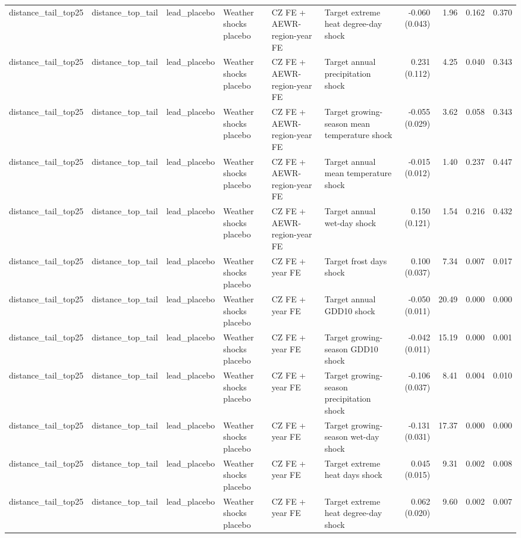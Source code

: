 \begin{tabular}{llllllrrrr}
distance_tail_top25 & distance_top_tail & lead_placebo & Weather shocks placebo & CZ FE + AEWR-region-year FE & Target extreme heat degree-day shock & -0.060 (0.043) & 1.96 & 0.162 & 0.370 \\
distance_tail_top25 & distance_top_tail & lead_placebo & Weather shocks placebo & CZ FE + AEWR-region-year FE & Target annual precipitation shock & 0.231 (0.112) & 4.25 & 0.040 & 0.343 \\
distance_tail_top25 & distance_top_tail & lead_placebo & Weather shocks placebo & CZ FE + AEWR-region-year FE & Target growing-season mean temperature shock & -0.055 (0.029) & 3.62 & 0.058 & 0.343 \\
distance_tail_top25 & distance_top_tail & lead_placebo & Weather shocks placebo & CZ FE + AEWR-region-year FE & Target annual mean temperature shock & -0.015 (0.012) & 1.40 & 0.237 & 0.447 \\
distance_tail_top25 & distance_top_tail & lead_placebo & Weather shocks placebo & CZ FE + AEWR-region-year FE & Target annual wet-day shock & 0.150 (0.121) & 1.54 & 0.216 & 0.432 \\
distance_tail_top25 & distance_top_tail & lead_placebo & Weather shocks placebo & CZ FE + year FE & Target frost days shock & 0.100 (0.037) & 7.34 & 0.007 & 0.017 \\
distance_tail_top25 & distance_top_tail & lead_placebo & Weather shocks placebo & CZ FE + year FE & Target annual GDD10 shock & -0.050 (0.011) & 20.49 & 0.000 & 0.000 \\
distance_tail_top25 & distance_top_tail & lead_placebo & Weather shocks placebo & CZ FE + year FE & Target growing-season GDD10 shock & -0.042 (0.011) & 15.19 & 0.000 & 0.001 \\
distance_tail_top25 & distance_top_tail & lead_placebo & Weather shocks placebo & CZ FE + year FE & Target growing-season precipitation shock & -0.106 (0.037) & 8.41 & 0.004 & 0.010 \\
distance_tail_top25 & distance_top_tail & lead_placebo & Weather shocks placebo & CZ FE + year FE & Target growing-season wet-day shock & -0.131 (0.031) & 17.37 & 0.000 & 0.000 \\
distance_tail_top25 & distance_top_tail & lead_placebo & Weather shocks placebo & CZ FE + year FE & Target extreme heat days shock & 0.045 (0.015) & 9.31 & 0.002 & 0.008 \\
distance_tail_top25 & distance_top_tail & lead_placebo & Weather shocks placebo & CZ FE + year FE & Target extreme heat degree-day shock & 0.062 (0.020) & 9.60 & 0.002 & 0.007 \\

\end{tabular}
